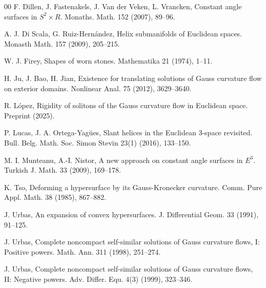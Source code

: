 \documentclass[12pt]{amsart}
\theoremstyle{definition}
\begin{document}
\begin{thebibliography}{00}
 F. Dillen, J. Fastenakels, J. Van der Veken, L. Vrancken, Constant angle surfaces in $S^2 \times R$. Monaths. Math. 152 (2007), 89--96.

 A. J. Di Scala, G. Ruiz-Hern\'andez, Helix submanifolds of Euclidean spaces. Monasth Math. 157 (2009), 205--215.



 W. J. Firey, Shapes of worn stones. Mathematika 21 (1974), 1--11.



 

 H. Ju, J. Bao, H. Jian, Existence for translating solutions of Gauss curvature flow on exterior domains. Nonlinear Anal. 75 (2012),  3629--3640.

 R. L\'opez, Rigidity of solitons of the Gauss curvature flow in Euclidean space. Preprint (2025).

 P. Lucas, J. A. Ortega-Yagües, Slant helices in the Euclidean 3-space revisited. Bull. Belg. Math. Soc. Simon Stevin 23(1) (2016), 133–150.

 M. I. Munteanu, A.-I. Nistor, A new approach on constant angle surfaces in $E^3$. Turkish J. Math. 33 (2009), 169–178.

 K. Tso,  Deforming a hypersurface by its Gauss-Kronecker curvature. Comm. Pure Appl. Math. 38 (1985), 867--882.

 J. Urbas, An expansion of convex hypersurfaces. J. Differential Geom. 33 (1991), 91--125.

 J. Urbas, Complete noncompact self-similar solutions of Gauss curvature flows, I: Positive powers. Math. Ann. 311  (1998), 251--274.

 J. Urbas, Complete noncompact self-similar solutions of Gauss curvature flows, II: Negative powers. Adv. Differ. Equ. 4(3)  (1999), 323--346.


\end{thebibliography}
\end{document}
